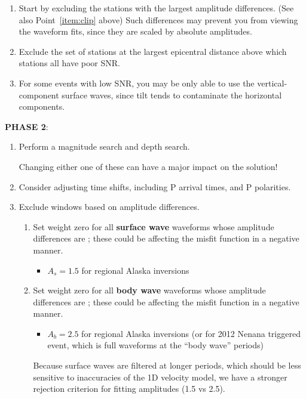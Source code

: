 \begin{enumerate}
\begin{enumerate}
\item Start by excluding the stations with the largest amplitude differences. (See also Point~\ref{item:clip} above) Such differences may prevent you from viewing the waveform fits, since they are scaled by absolute amplitudes.

\item Exclude the set of stations at the largest epicentral distance above which stations all have poor SNR.

\item For some events with low SNR, you may be only able to use the vertical-component surface waves, since tilt tends to contaminate the horizontal components.
\end{enumerate}

\medskip\noindent
{\bf PHASE 2}:
\begin{enumerate}
\item Perform a magnitude search and depth search.

Changing either one of these can have a major impact on the solution!

\item Consider adjusting time shifts, including P arrival times, and P polarities.

\item Exclude windows based on amplitude differences.
%
\begin{enumerate}
\item Set weight zero for all {\bf surface wave} waveforms whose amplitude differences are ; these could be affecting the misfit function in a negative manner.
\begin{itemize}
\item $A_s = 1.5$ for regional Alaska inversions
\end{itemize}

\item Set weight zero for all {\bf body wave} waveforms whose amplitude differences are ; these could be affecting the misfit function in a negative manner.
\begin{itemize}
\item $A_b = 2.5$ for regional Alaska inversions (or for 2012 Nenana triggered event, which is full waveforms at the ``body wave'' periods)

\end{itemize}

Because surface waves are filtered at longer periods, which should be less sensitive to inaccuracies of the 1D velocity model, we have a stronger rejection criterion for fitting amplitudes (1.5 vs 2.5).


\end{enumerate}
\end{enumerate}
\end{enumerate}
